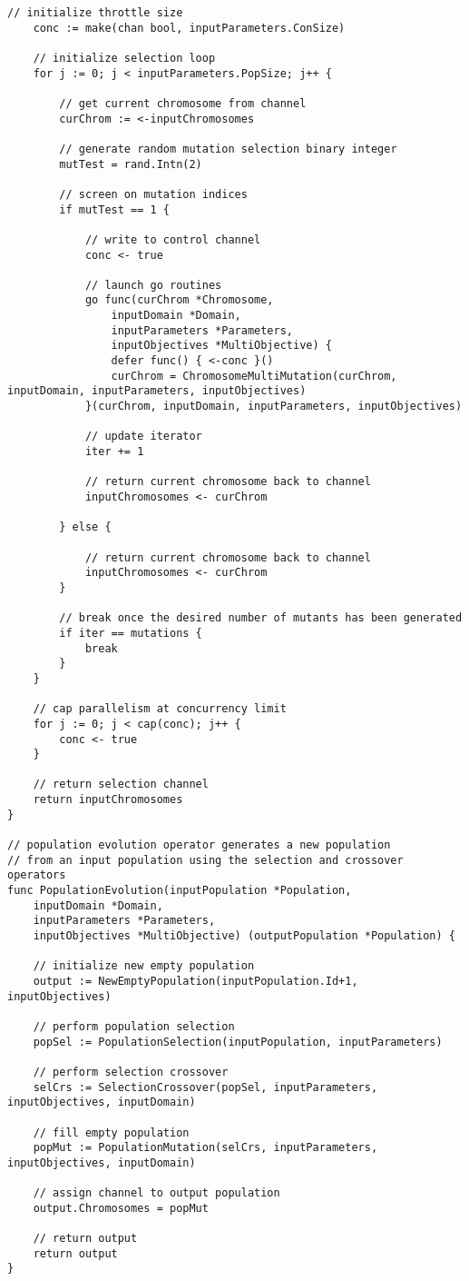 \begin{lstlisting}[basicstyle=\tiny]
	// initialize throttle size
	conc := make(chan bool, inputParameters.ConSize)

	// initialize selection loop
	for j := 0; j < inputParameters.PopSize; j++ {

		// get current chromosome from channel
		curChrom := <-inputChromosomes

		// generate random mutation selection binary integer
		mutTest = rand.Intn(2)

		// screen on mutation indices
		if mutTest == 1 {

			// write to control channel
			conc <- true

			// launch go routines
			go func(curChrom *Chromosome, 
			    inputDomain *Domain, 
			    inputParameters *Parameters, 
			    inputObjectives *MultiObjective) {
				defer func() { <-conc }()
				curChrom = ChromosomeMultiMutation(curChrom, inputDomain, inputParameters, inputObjectives)
			}(curChrom, inputDomain, inputParameters, inputObjectives)

			// update iterator
			iter += 1

			// return current chromosome back to channel
			inputChromosomes <- curChrom

		} else {

			// return current chromosome back to channel
			inputChromosomes <- curChrom
		}

		// break once the desired number of mutants has been generated
		if iter == mutations {
			break
		}
	}

	// cap parallelism at concurrency limit
	for j := 0; j < cap(conc); j++ {
		conc <- true
	}

	// return selection channel
	return inputChromosomes
}

// population evolution operator generates a new population
// from an input population using the selection and crossover operators
func PopulationEvolution(inputPopulation *Population, 
    inputDomain *Domain, 
    inputParameters *Parameters, 
    inputObjectives *MultiObjective) (outputPopulation *Population) {

	// initialize new empty population
	output := NewEmptyPopulation(inputPopulation.Id+1, inputObjectives)

	// perform population selection
	popSel := PopulationSelection(inputPopulation, inputParameters)

	// perform selection crossover
	selCrs := SelectionCrossover(popSel, inputParameters, inputObjectives, inputDomain)

	// fill empty population
	popMut := PopulationMutation(selCrs, inputParameters, inputObjectives, inputDomain)

	// assign channel to output population
	output.Chromosomes = popMut

	// return output
	return output
}

\end{lstlisting}

